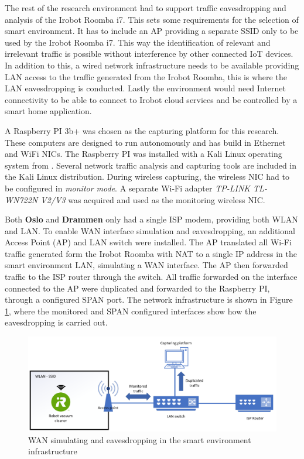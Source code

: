 The rest of the research environment had to support traffic eavesdropping and analysis of the Irobot Roomba i7. This sets some requirements for the selection of smart environment. It has to include an \gls{AP} providing a separate \gls{SSID} only to be used by the Irobot Roomba i7. This way the identification of relevant and irrelevant traffic is possible without interference by other connected \gls{IoT} devices. In addition to this, a wired network infrastructure needs to be available providing \gls{LAN} access to the traffic generated from the Irobot Roomba, this is where the \gls{LAN} eavesdropping is conducted. Lastly the environment would need Internet connectivity to be able to connect to Irobot cloud services and be controlled by a smart home application. 

A Raspberry PI 3b+ was chosen as the capturing platform for this research. These computers are designed to run autonomously and has build in Ethernet and WiFi \gls{NIC}s. The Raspberry PI was installed with a Kali Linux operating system from \cite{kalidownload}. Several network traffic analysis and capturing tools are included in the Kali Linux distribution. During wireless capturing, the wireless \gls{NIC} had to be configured in \textit{monitor mode}. A separate \gls{Wi-Fi} adapter \textit{TP-LINK TL-WN722N V2/V3} was acquired and used as the monitoring wireless \gls{NIC}.

Both \textbf{Oslo} and \textbf{Drammen} only had a single \gls{ISP} modem, providing both WLAN and \gls{LAN}. To enable \gls{WAN} interface simulation and eavesdropping, an additional Access Point (AP) and \gls{LAN} switch were installed. The \gls{AP} translated all \gls{Wi-Fi} traffic generated form the Irobot Roomba with \gls{NAT} to a single \gls{IP} address in the smart environment \gls{LAN}, simulating a \gls{WAN} interface. The \gls{AP} then forwarded traffic to the \gls{ISP} router through the switch. All traffic forwarded on the interface connected to the \gls{AP} were duplicated and forwarded to the Raspberry PI, through a configured SPAN port. The network infrastructure is shown in Figure \ref{fig:WLAN_LAN_setup}, where the monitored and SPAN configured interfaces show how the eavesdropping is carried out. 

\begin{figure}[H]
    \centering
    \includegraphics[width=\textwidth]{figures/WLAN_LAN_setup.png}
    \caption{\gls{WAN} simulating and eavesdropping in the smart environment infrastructure}
    \label{fig:WLAN_LAN_setup}
\end{figure}


